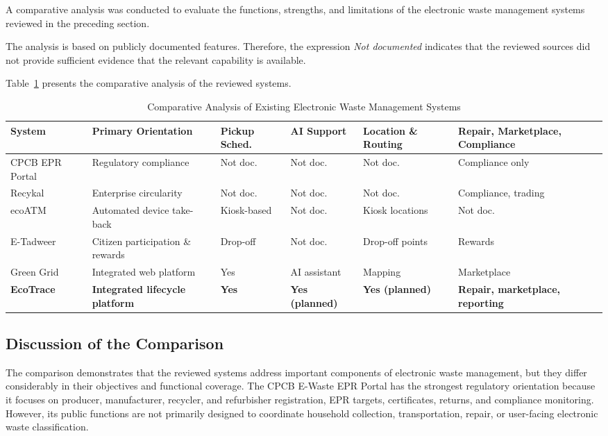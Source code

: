 A comparative analysis was conducted to evaluate the functions, strengths, and
limitations of the electronic waste management systems reviewed in the
preceding section.

The analysis is based on publicly documented features. Therefore, the
expression \emph{Not documented} indicates that the reviewed sources did not
provide sufficient evidence that the relevant capability is available.

Table~\ref{tab:comparative-analysis} presents the comparative analysis of the
reviewed systems.

\begin{table}[H]
\centering
\caption{Comparative Analysis of Existing Electronic Waste Management Systems}
\label{tab:comparative-analysis}
\begin{tabular}{@{}p{2.6cm}p{2.6cm}p{1.6cm}p{1.6cm}p{2.2cm}p{2.6cm}@{}}
\toprule
\textbf{System} & \textbf{Primary Orientation} & \textbf{Pickup Sched.} & \textbf{AI Support} & \textbf{Location \& Routing} & \textbf{Repair, Marketplace, Compliance} \\
\midrule
CPCB EPR Portal & Regulatory compliance & Not doc. & Not doc. & Not doc. & Compliance only \\
Recykal & Enterprise circularity & Not doc. & Not doc. & Not doc. & Compliance, trading \\
ecoATM & Automated device take-back & Kiosk-based & Not doc. & Kiosk locations & Not doc. \\
E-Tadweer & Citizen participation \& rewards & Drop-off & Not doc. & Drop-off points & Rewards \\
Green Grid & Integrated web platform & Yes & AI assistant & Mapping & Marketplace \\
\textbf{EcoTrace} & \textbf{Integrated lifecycle platform} & \textbf{Yes} & \textbf{Yes (planned)} & \textbf{Yes (planned)} & \textbf{Repair, marketplace, reporting} \\
\bottomrule
\end{tabular}
\end{table}

\subsection{Discussion of the Comparison}

The comparison demonstrates that the reviewed systems address important
components of electronic waste management, but they differ considerably in their
objectives and functional coverage. The CPCB E-Waste EPR Portal has the
strongest regulatory orientation because it focuses on producer, manufacturer,
recycler, and refurbisher registration, EPR targets, certificates, returns, and
compliance monitoring. However, its public functions are not primarily designed
to coordinate household collection, transportation, repair, or user-facing
electronic waste classification.

